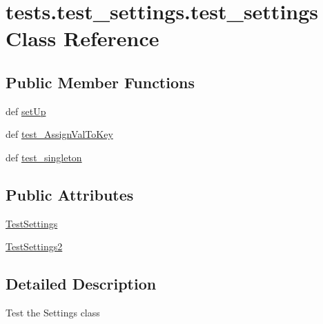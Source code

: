 \hypertarget{classtests_1_1test__settings_1_1test__settings}{\section{tests.\-test\-\_\-settings.\-test\-\_\-settings \-Class \-Reference}
\label{classtests_1_1test__settings_1_1test__settings}
}
\subsection*{\-Public \-Member \-Functions}
\begin{DoxyCompactItemize}
\item 
def \hyperlink{classtests_1_1test__settings_1_1test__settings_ab588802ef7476e05bc93c190a6c8038d}{set\-Up}
\item 
def \hyperlink{classtests_1_1test__settings_1_1test__settings_a642e06380692abf90f7122af8177bbca}{test\-\_\-\-Assign\-Val\-To\-Key}
\item 
def \hyperlink{classtests_1_1test__settings_1_1test__settings_a65d6dce12a3827fcfa731327d45ceebb}{test\-\_\-singleton}
\end{DoxyCompactItemize}
\subsection*{\-Public \-Attributes}
\begin{DoxyCompactItemize}
\item 
\hyperlink{classtests_1_1test__settings_1_1test__settings_ac837eed1710dc70921bd67c7fa630a62}{\-Test\-Settings}
\item 
\hyperlink{classtests_1_1test__settings_1_1test__settings_a8cd83a51a7a86641ec3e10a7a19802e4}{\-Test\-Settings2}
\end{DoxyCompactItemize}


\subsection{\-Detailed \-Description}
\begin{DoxyVerb}Test the Settings class\end{DoxyVerb}
 

